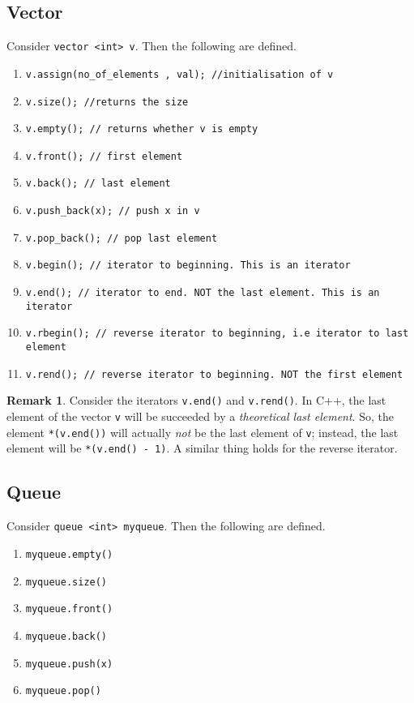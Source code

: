 \documentclass[12pt,a4paper]{amsart}
\numberwithin{equation}{section}
\theoremstyle{definition}
\newtheorem{Remark}{Remark}[Th]
\begin{document}
\subsection{Vector} Consider \verb|vector <int> v|. Then the following are defined.
\begin{enumerate}
    \item \verb|v.assign(no_of_elements , val); //initialisation of v|
    \item \verb|v.size(); //returns the size|
    \item \verb|v.empty(); // returns whether v is empty|
    \item \verb|v.front(); // first element|
    \item \verb|v.back(); // last element|
    \item \verb|v.push_back(x); // push x in v|
    \item \verb|v.pop_back(); // pop last element|
    \item \verb|v.begin(); // iterator to beginning. This is an iterator|
    \item \verb|v.end(); // iterator to end. NOT the last element. This is an iterator|
    \item \verb|v.rbegin(); // reverse iterator to beginning, i.e iterator to last element|
    \item \verb|v.rend(); // reverse iterator to beginning. NOT the first element|
\end{enumerate}
\begin{Remark}
    Consider the iterators \verb|v.end()| and \verb|v.rend()|. In C++, the last element of the vector \verb|v| will be succeeded by a \textit{theoretical last element}. So, the element \verb|*(v.end())| will actually \textit{not} be the last element of \verb|v|; instead, the last element will be \verb|*(v.end() - 1)|. A similar thing holds for the reverse iterator.
\end{Remark}

\subsection{Queue} Consider \verb|queue <int> myqueue|. Then the following are defined. 
\begin{enumerate}
    \item \verb|myqueue.empty()|
    \item \verb|myqueue.size()|
    \item \verb|myqueue.front()|
    \item \verb|myqueue.back()|
    \item \verb|myqueue.push(x)|
    \item \verb|myqueue.pop()|
\end{enumerate}
\end{document}
